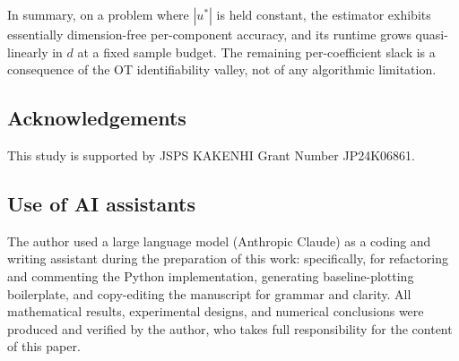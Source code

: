 \documentclass[11pt,leqno]{article}
\theoremstyle{plain}
\theoremstyle{remark}
\theoremstyle{definition}
\numberwithin{equation}{section}
\numberwithin{figure}{section}
\numberwithin{table}{section}
\begin{document}
In summary, on a problem where $|u^{*}|$ is held constant, the
estimator exhibits essentially dimension-free per-component accuracy,
and its runtime grows quasi-linearly in $d$ at a fixed sample budget.
The remaining per-coefficient slack is a consequence of the OT
identifiability valley, not of any algorithmic limitation.

\subsection*{Acknowledgements}

This study is supported by JSPS KAKENHI Grant Number JP24K06861.


\subsection*{Use of AI assistants}
The author used a large language model (Anthropic Claude) as a
coding and writing assistant during the preparation of this work:
specifically, for refactoring and commenting the Python implementation,
generating baseline-plotting boilerplate, and copy-editing the
manuscript for grammar and clarity.  All mathematical results,
experimental designs, and numerical conclusions were produced and
verified by the author, who takes full responsibility for the
content of this paper.



\end{document}
